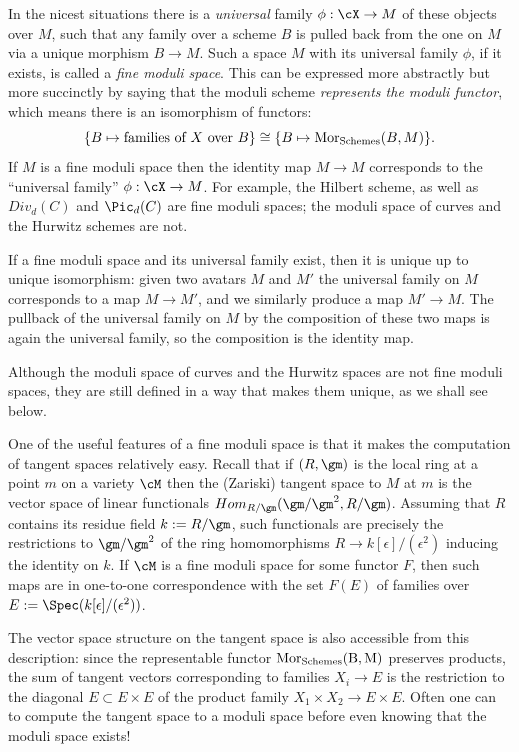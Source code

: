 In the nicest situations there is a \emph{universal} family $\phi: \cX\to M$ of these objects over $M$,
such that any family over a scheme $B$  is pulled back from the one on $M$ via a unique morphism $B\to M.$  Such a space $M$ with its universal family $\phi$, if it exists, is called a \emph{fine moduli space}. This can be expressed more abstractly but more succinctly by saying that the moduli scheme \emph{represents the moduli functor}, which means there is an isomorphism of functors:
$$
\{ B \mapsto \text{families of } X \text{ over } B \} \cong \{ B\mapsto {\rm{Mor}}_{{\rm Schemes}}(B, M) \}.
$$
If $M$ is a fine moduli space then the identity map $M\to M$ corresponds to the ``universal family'' $\phi: \cX \to M$. 
For example, the Hilbert scheme, as well as $Div_d(C)$ and $\Pic_d(C)$ are fine moduli spaces; the moduli space of curves
and the Hurwitz schemes are not.

If a fine moduli space and its universal family exist, then it is unique up to unique isomorphism: given two avatars $M$ and $M'$
the universal family on $M$ corresponds to a map $M\to M'$, and we similarly produce a map $M'\to M$. The pullback of the universal family on $M$ by the composition of these two maps is again the universal family, so the composition is the identity map.

Although the moduli space of curves and the Hurwitz spaces are not fine moduli spaces, they are still defined
in a way that makes them unique, as we shall see below.

\def\eps{{\epsilon}}
One of the useful features of a fine moduli space is that it makes the computation of tangent spaces relatively easy.
Recall that if $(R,\gm)$ is the local ring at a point $m$ on a variety $\cM$ then the (Zariski) tangent
space to $M$ at $m$ is the vector space of linear functionals $Hom_{R/\gm}(\gm/\gm^2, R/\gm)$.   Assuming that
$R$ contains its residue field $k := R/\gm$, such functionals
are precisely the restrictions to $\gm/\gm^2$ of the ring homomorphisms $R \to k[\eps]/(\eps^2)$ inducing the identity on $k$.
 If $\cM$ is a fine moduli space for some functor $F$, then such maps are in one-to-one correspondence
with the set $F(E)$ of families over $E := \Spec(k[\eps]/(\eps^2))$. 


The vector space structure on the tangent space is also accessible from this description: since the representable
functor $\rm{Mor}_{\rm Schemes}(B, M)$ preserves products, the
 sum of tangent vectors corresponding to families $X_i \to E$ is the restriction to the diagonal
 $E \subset E\times E$
 of the product family $X_1 \times X_2 \to E\times E$.
Often one can to compute the tangent space to a moduli space before even knowing that the moduli space exists!

